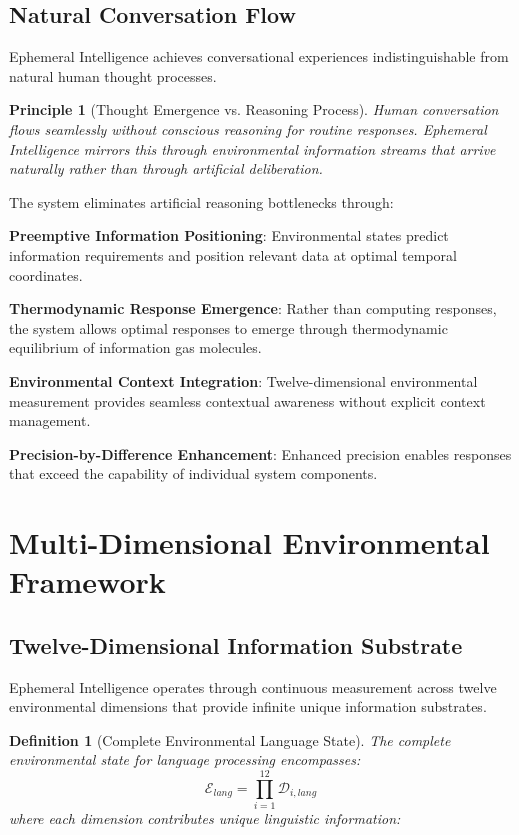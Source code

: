 \documentclass[12pt,a4paper]{article}
\newtheorem{definition}{Definition}
\newtheorem{principle}{Principle}
\begin{document}
\subsection{Natural Conversation Flow}

Ephemeral Intelligence achieves conversational experiences indistinguishable from natural human thought processes.

\begin{principle}[Thought Emergence vs. Reasoning Process]
Human conversation flows seamlessly without conscious reasoning for routine responses. Ephemeral Intelligence mirrors this through environmental information streams that arrive naturally rather than through artificial deliberation.
\end{principle}

The system eliminates artificial reasoning bottlenecks through:

\textbf{Preemptive Information Positioning}: Environmental states predict information requirements and position relevant data at optimal temporal coordinates.

\textbf{Thermodynamic Response Emergence}: Rather than computing responses, the system allows optimal responses to emerge through thermodynamic equilibrium of information gas molecules.

\textbf{Environmental Context Integration}: Twelve-dimensional environmental measurement provides seamless contextual awareness without explicit context management.

\textbf{Precision-by-Difference Enhancement}: Enhanced precision enables responses that exceed the capability of individual system components.

\section{Multi-Dimensional Environmental Framework}

\subsection{Twelve-Dimensional Information Substrate}

Ephemeral Intelligence operates through continuous measurement across twelve environmental dimensions that provide infinite unique information substrates.

\begin{definition}[Complete Environmental Language State]
The complete environmental state for language processing encompasses:
\begin{equation}
\mathcal{E}_{lang} = \prod_{i=1}^{12} \mathcal{D}_{i,lang}
\end{equation}
where each dimension contributes unique linguistic information:
\end{definition}
\end{document}

